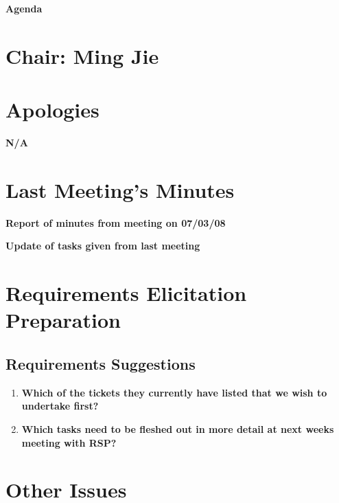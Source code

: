 \documentclass[10pt,english, a4paper]{article}
\begin{document}
\begin{center}
\textbf{\huge Agenda }
\par\end{center}{\huge \par}


\section*{{\huge Chair: Ming Jie}}

\section{{\huge Apologies}}

\textbf{\huge N/A}{\huge \par}

\section{{\huge Last Meeting's Minutes}}

\textbf{\huge Report of minutes from meeting on 07/03/08}{\huge \par}
\textbf{\huge Update of tasks given from last meeting}{\huge \par}

\section{{\huge Requirements Elicitation Preparation}}

\textbf{\huge %
}{\huge \par}

\subsection{{\huge Requirements Suggestions}}

\begin{enumerate}
\item \textbf{\huge Which of the tickets they currently have listed that we wish to undertake first?}{\huge \par}
\item \textbf{\huge Which tasks need to be fleshed out in more detail at next weeks meeting with RSP?}{\huge \par}
\end{enumerate}

\section{{\huge Other Issues}}
\end{document}
